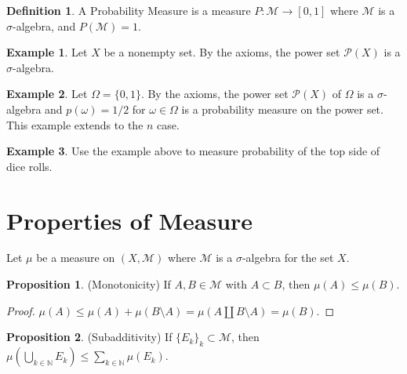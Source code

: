 \documentclass[12pt, reqno]{amsart}
\numberwithin{equation}{section}
\theoremstyle{definition}
\newtheorem*{proposition*}{Proposition}
\theoremstyle{definition}
\newtheorem*{definition*}{Definition}
\newtheorem*{example*}{Example}
\newcommand{\N}{\mathbb{N}}
\newcommand{\w}{\omega}
\newcommand{\union}{\bigcup}
\newcommand{\powerset}{\mathcal{P}}
\begin{document}
\begin{definition*}
A Probability Measure is a measure $P : \mathcal{M} \to [0, 1]$ where $\mathcal{M}$ is a $\sigma$-algebra, and $P(\mathcal{M}) = 1$.
\end{definition*}

\begin{example*}
Let $X$ be a nonempty set. By the axioms, the power set $\powerset(X)$ is a $\sigma$-algebra.
\end{example*}

\begin{example*}
Let $\Omega = \{ 0, 1 \}$. By the axioms, the power set $\powerset(X)$ of $\Omega$ is a $\sigma$-algebra and $p(\w) = 1/2$ for $\w \in \Omega$ is a probability measure on the power set. This example extends to the $n$ case.
\end{example*}

\begin{example*}
Use the example above to measure probability of the top side of dice rolls.
\end{example*}

\section{Properties of Measure}

Let $\mu$ be a measure on $(X, \mathcal{M})$ where $\mathcal{M}$ is a $\sigma$-algebra for the set $X$.

\begin{proposition*}
(Monotonicity)
If $A, B \in \mathcal{M}$ with $A \subset B$,
then $\mu(A) \le \mu(B).$
\end{proposition*}

\begin{proof}
$\mu(A) \le \mu(A) + \mu(B \setminus A) = \mu(A \coprod B \setminus A) = \mu(B).$
\end{proof}

\begin{proposition*}
(Subadditivity)
If $\{ E_k \}_k \subset \mathcal{M}$,
then $\mu(\union_{k \in \N} E_k) \le \sum_{k \in \N} \mu(E_k).$
\end{proposition*}
\end{document}
